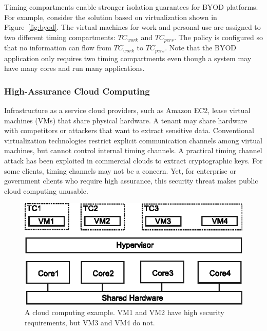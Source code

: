 Timing compartments enable stronger isolation guarantees for BYOD
platforms. For example, consider the solution based on virtualization shown in 
Figure~\ref{fig:byod}. The virtual machines for
work and personal use are assigned to two different timing compartments:
$TC_{work}$ and $TC_{pers}$. The policy is configured so that no information can 
flow from $TC_{work}$ to $TC_{pers}$.
Note that the BYOD application only requires two timing compartments even
though a system may have many cores and run many applications.

\subsubsection{High-Assurance Cloud Computing}

Infrastructure as a service cloud providers, such as Amazon EC2, lease virtual 
machines (VMs) that share physical hardware. 
A tenant may share hardware with competitors or attackers that want
to extract sensitive data. Conventional virtualization technologies restrict 
explicit
communication channels among virtual machines, but cannot control internal
timing channels. A practical timing channel attack has been exploited
in commercial clouds to extract cryptographic keys\cite{heyyou}.
For some clients, timing channels may not be a concern. Yet, for enterprise or 
government clients who require high assurance,
this security threat makes public cloud computing unusable. 

\begin{figure}
    \begin{center}
        \includegraphics{figs/cloud_tcs.eps}
        \caption{A cloud computing example. VM1 and VM2 have high security 
        requirements, but VM3 and VM4 do not.}
        \label{fig:cloud_tcs}
    \end{center}
\end{figure}

